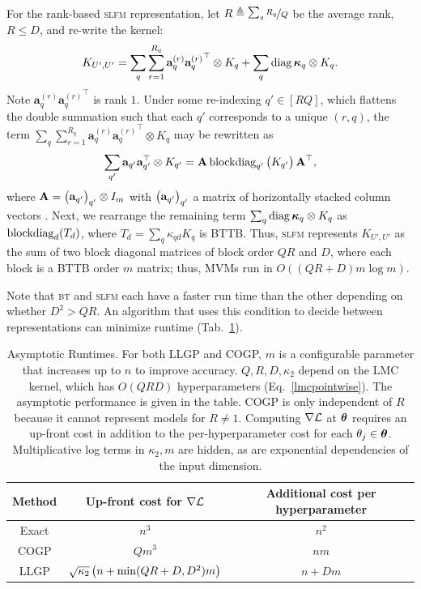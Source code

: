 \documentclass[twoside]{article}
\begin{document}
For the rank-based \textsc{slfm} representation, let $R\triangleq \nicefrac{\sum_qR_q}{Q}$ be the average rank, $R\le D$, and re-write the kernel:
\begin{align*}
  K_{{U'},{U'}}=\sum_q\sum_{r=1}^{R_q}\textbf{a}_q^{(r)}{\textbf{a}_q^{(r)}}^\top\otimes K_q + \sum_q\operatorname{diag}{\boldsymbol\kappa}_q \otimes K_q.
\end{align*}
Note $\textbf{a}_q^{(r)}{\textbf{a}_q^{(r)}}^\top$ is rank $1$. Under some re-indexing $q'\in[RQ]$, which flattens the double summation such that each $q'$ corresponds to a unique $(r, q)$, the term $\sum_q\sum_{r=1}^{R_q}\textbf{a}_q^{(r)}{\textbf{a}_q^{(r)}}^\top\otimes K_q $ may be rewritten as
\begin{align*}
  \sum_{q'}\textbf{a}_{q'}\textbf{a}_{q'}^\top\otimes K_{q'} = \textbf{A}\operatorname{blockdiag}_{q'}\begin{pmatrix} K_{q'} \end{pmatrix}\textbf{A}^\top,
\end{align*}
where $\textbf{A}=\begin{pmatrix}  \textbf{a}_{q'} \end{pmatrix}_{q'}\otimes I_m$ with $\begin{pmatrix}  \textbf{a}_{q'} \end{pmatrix}_{q'}$ a matrix of horizontally stacked column vectors \citep{seeger2005semiparametric}. Next, we rearrange the remaining term $\sum_q\operatorname{diag}{\boldsymbol\kappa}_q \otimes K_q$ as $\operatorname{blockdiag}_d(T_d)$, where $T_d=\sum_q \kappa_{qd}K_q$ is BTTB. Thus, \textsc{slfm} represents $K_{{U'},{U'}}$ as the sum of two block diagonal matrices of block order $QR$ and $D$, where each block is a BTTB order $m$ matrix; thus, MVMs run in $O((QR + D)m\log m)$.

Note that \textsc{bt} and \textsc{slfm} each have a faster run time than the other depending on whether $D^2>QR$. An algorithm that uses this condition to decide between representations can minimize runtime (Tab.~\ref{asymp}). 

\begin{table}[!ht]
  \caption{
   Asymptotic Runtimes. For both LLGP and COGP, $m$ is a configurable parameter that increases up to $n$ to improve accuracy. $Q,R,D,\kappa_2$ depend on the LMC kernel, which has $O(QRD)$ hyperparameters (Eq.~\ref{lmcpointwise}). The asymptotic performance is given in the table. COGP is only independent of $R$ because it cannot represent models for $R\neq 1$. Computing $\nabla\mathcal{L}$ at ${\boldsymbol\theta}$ requires an up-front cost in addition to the per-hyperparameter cost for each $\theta_j\in{\boldsymbol\theta}$. Multiplicative log terms in $\kappa_2, m$ are hidden, as are exponential dependencies of the input dimension.
  }
\label{asymp}
\begin{sc}
\begin{center}
\begin{small}
\begin{tabular}{ccc}
  \toprule
  Method & Up-front cost for $\nabla \mathcal{L}$ & Additional cost per hyperparameter\\
  \midrule
  Exact & $n^3$ & $n^2 $\\
  COGP & $Qm^3$ & $nm$ \\
  LLGP & $\sqrt{\kappa_2} \left({n +\min(QR+D, D^2) m}\right)$ &  $n + D m$ \\
  \bottomrule
\end{tabular}
\end{small}
\end{center}
\end{sc}
\end{table}
\end{document}
